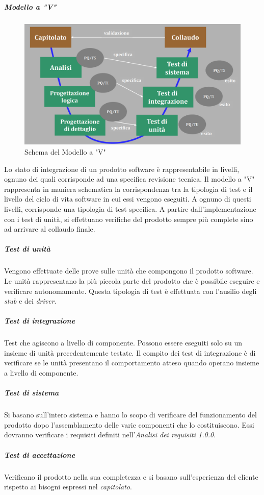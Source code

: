 \subparagraph*{Modello a "V"}
\begin{figure}[h!]
	\caption{Schema del Modello a "V"}
	\centering
	\includegraphics[width=\textwidth]{res/img/modelloV.png}
\end{figure}
Lo stato di integrazione di un prodotto software è rappresentabile in livelli, ognuno dei quali corrisponde ad una specifica revisione tecnica. Il modello a "V" rappresenta in maniera schematica la corrispondenza tra la tipologia di test e il livello del ciclo di vita software in cui essi vengono eseguiti. A ognuno di questi livelli, corrisponde una tipologia di test specifica. A partire dall'implementazione con i test di unità, si effettuano verifiche del prodotto sempre più complete sino ad arrivare al collaudo finale.

\subparagraph*{Test di unità}
Vengono effettuate delle prove sulle unità che compongono il prodotto software. Le unità rappresentano la più piccola parte del prodotto che è possibile eseguire e verificare autonomamente. Questa tipologia di test è effettuata con l'ausilio degli \textit{stub\glo} e dei \textit{driver\glos}.

\subparagraph*{Test di integrazione}
Test che agiscono a livello di componente. Possono essere eseguiti solo su un insieme di unità precedentemente testate. Il compito dei test di integrazione è di verificare se le unità presentano il comportamento atteso quando operano insieme a livello di componente.

\subparagraph*{Test di sistema} 
Si basano sull'intero sistema e hanno lo scopo di verificare del funzionamento del prodotto dopo l'assemblamento delle varie componenti che lo costituiscono. Essi dovranno verificare i requisiti definiti nell'\textit{Analisi dei requisiti 1.0.0\docs}.

\subparagraph*{Test di accettazione}
Verificano il prodotto nella sua completezza e si basano sull'esperienza del cliente rispetto ai bisogni espressi nel \textit{capitolato\glos}.

